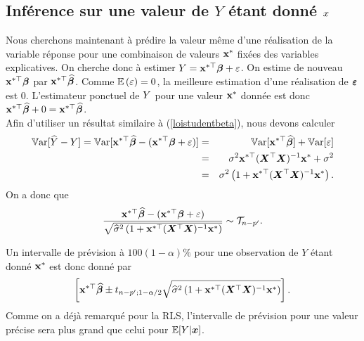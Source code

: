 \subsection{Inférence sur une valeur de $Y$ étant donné $x$}
\label{sec:previsionRLM2}


Nous cherchons maintenant à prédire la valeur même d'une
réalisation de la variable réponse pour une combinaison de
valeurs $\bold{x}^*$ fixées des variables explicatives. 
On cherche donc à estimer $Y=\bold{x}^{*\top}\bm\beta+\varepsilon$. On estime de nouveau
$\bold{x}^{*\top}\bm\beta$ par $\bold{x}^{*\top}\widehat{\bm\beta}$. Comme
$\mathbb{E}\left(\varepsilon\right)={0}$, la meilleure estimation d'une réalisation de
$\bm\varepsilon$ est ${0}$. L'estimateur ponctuel de $Y$ pour une
valeur $\bold{x}^*$ donnée est donc
$\bold{x}^{*\top}\widehat{\bm\beta}+0=\bold{x}^{*\top}\widehat{\bm\beta}$. \\

Afin d'utiliser
un résultat similaire à (\ref{loistudentbeta}), nous devons calculer
\begin{eqnarray*}
\mathbb{V}\text{ar}[\widehat{Y}-Y]=\mathbb{V}\text{ar}[\bold{x}^{*\top}\widehat{\bm\beta}-(\bold{x}^{*\top}\bm\beta+\varepsilon)]&=&
\mathbb{V}\text{ar}[\bold{x}^{*\top}\widehat{\bm\beta}]+\mathbb{V}\text{ar}[\varepsilon]\\
&=&\sigma^2\bold{x}^{*\top}(\bm{X}^\top\bm{X})^{-1}\bold{x}^*+\sigma^2\\
&=&\sigma^2\left(
1+\bold{x}^{*\top}(\bm{X}^\top\bm{X})^{-1}\bold{x}^*\right).
\end{eqnarray*}
On a donc que
\begin{equation}\label{pivot:Y}
{\bold{x}^{*\top}\widehat{\bm\beta}-(\bold{x}^{*\top}\bm\beta+\varepsilon)\over
\sqrt{\widehat{\sigma}^2\left(1+\bold{x}^{*\top}(\bm{X}^\top\bm{X})^{-1}\bold{x}^*\right)}}\sim
\mathcal{T}_{n-p'}.
\end{equation}

Un intervalle de prévision \`a $100(1-\alpha)\%$ pour une observation de $Y$ étant donné $\bold{x}^*$ est donc donné par
\begin{equation}\label{ci:Y}
\left[\bold{x}^{*\top}\widehat{\bm\beta}\pm
t_{n-p';1-\alpha/2}\sqrt{\widehat{\sigma}^2\left(1+\bold{x}^{*\top}(\bm{X}^\top\bm{X})^{-1}\bold{x}^*\right)}\right].
\end{equation}
Comme on a déjà remarqué pour la RLS, l'intervalle de prévision pour une valeur précise sera plus grand que celui pour $\mathbb{E}[Y|{\bm{x}}]$.

